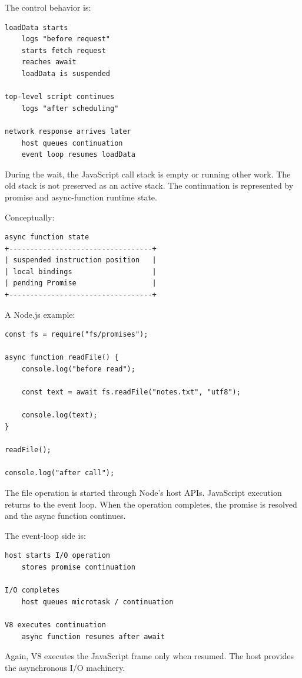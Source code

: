 The control behavior is:

\begin{verbatim}
loadData starts
    logs "before request"
    starts fetch request
    reaches await
    loadData is suspended

top-level script continues
    logs "after scheduling"

network response arrives later
    host queues continuation
    event loop resumes loadData
\end{verbatim}

During the wait, the JavaScript call stack is empty or running other work. The old stack is not preserved as an active stack. The continuation is represented by promise and async-function runtime state.

Conceptually:

\begin{verbatim}
async function state
+----------------------------------+
| suspended instruction position   |
| local bindings                   |
| pending Promise                  |
+----------------------------------+
\end{verbatim}

A Node.js example:

\begin{verbatim}
const fs = require("fs/promises");

async function readFile() {
    console.log("before read");

    const text = await fs.readFile("notes.txt", "utf8");

    console.log(text);
}

readFile();

console.log("after call");
\end{verbatim}

The file operation is started through Node's host APIs. JavaScript execution returns to the event loop. When the operation completes, the promise is resolved and the async function continues.

The event-loop side is:

\begin{verbatim}
host starts I/O operation
    stores promise continuation

I/O completes
    host queues microtask / continuation

V8 executes continuation
    async function resumes after await
\end{verbatim}

Again, V8 executes the JavaScript frame only when resumed. The host provides the asynchronous I/O machinery.

